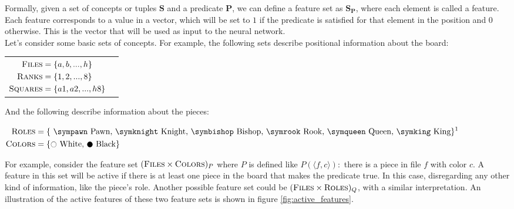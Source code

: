 Formally, given a set of concepts or tuples $\bm{S}$ and a predicate $\bm{P}$, we can define a feature set as ${\bm S}_{\bm P}$, where each element is called a feature. Each feature corresponds to a value in a vector, which will be set to $1$ if the predicate is satisfied for that element in the position and $0$ otherwise. This is the vector that will be used as input to the neural network. \\

Let's consider some basic sets of concepts. For example, the following sets describe positional information about the board:

\begin{center}
\begin{tabular}{cc}

$\begin{aligned}[t]
\textsc{Files} &= \{a, b, ..., h\} \\
\textsc{Ranks} &= \{1, 2, ..., 8\} \\
\textsc{Squares} &= \{a1, a2, ..., h8\}
\end{aligned}$

&

\raisebox{-10ex}{
\chessboard[
    tinyboard,
    showmover=false,
    pgfstyle={text},
    text=\fontsize{1.2ex}{1.2ex}\bfseries\sffamily \currentwq,
    markboard
]
}

\end{tabular}
\end{center}

And the following describe information about the pieces:

\begin{center}
$\begin{aligned}[t]
\featureset{Roles} &= \text{\{
    \sympawn\ Pawn,
    \symknight\ Knight,
    \symbishop\ Bishop,
    \symrook\ Rook,
    \symqueen\ Queen,
    \symking\ King\}}\textsuperscript{1} \\
\featureset{Colors} &= \text{\{\white\ White, \black\ Black\}}
\end{aligned}$
\end{center}


For example, consider the feature set $(\textsc{Files} \times \textsc{Colors})_{P}$ where $P$ is defined like $P(\langle f, c \rangle): $ there is a piece in file $f$ with color $c$. A feature in this set will be active if there is at least one piece in the board that makes the predicate true. In this case, disregarding any other kind of information, like the piece's role.
Another possible feature set could be $(\textsc{Files} \times \textsc{Roles})_{Q}$, with a similar interpretation. An illustration of the active features of these two feature sets is shown in figure \ref{fig:active_features}.

